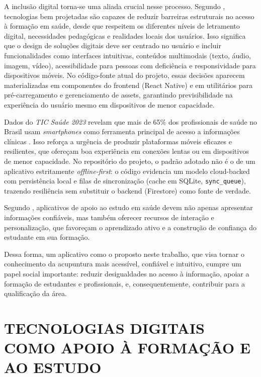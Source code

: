     A inclusão digital torna-se uma aliada crucial nesse processo. Segundo , tecnologias bem projetadas são capazes de reduzir barreiras estruturais no acesso à formação em saúde, desde que respeitem os diferentes níveis de letramento digital, necessidades pedagógicas e realidades locais dos usuários. Isso significa que o design de soluções digitais deve ser centrado no usuário e incluir funcionalidades como interfaces intuitivas, conteúdos multimodais (texto, áudio, imagem, vídeo), acessibilidade para pessoas com deficiência e responsividade para dispositivos móveis. No código-fonte atual do projeto, essas decisões aparecem materializadas em componentes do frontend (React Native) e em utilitários para pré-carregamento e gerenciamento de assets, garantindo previsibilidade na experiência do usuário mesmo em dispositivos de menor capacidade.

    Dados do \textit{TIC Saúde 2023} revelam que mais de 65\% dos profissionais de saúde no Brasil usam \textit{smartphones} como ferramenta principal de acesso a informações clínicas \cite{ticsaude2023}. Isso reforça a urgência de produzir plataformas móveis eficazes e resilientes, que ofereçam boa experiência em conexões lentas ou em dispositivos de menor capacidade. No repositório do projeto, o padrão adotado não é o de um aplicativo estritamente \textit{offline-first}: o código evidencia um modelo cloud-backed com persistência local e filas de sincronização (cache em SQLite, \texttt{sync\_queue}), trazendo resiliência sem substituir o backend (Firestore) como fonte de verdade.

Segundo , aplicativos de apoio ao estudo em saúde devem não apenas apresentar informações confiáveis, mas também oferecer recursos de interação e personalização, que favoreçam o aprendizado ativo e a construção de confiança do estudante em sua formação.

Dessa forma, um aplicativo como o proposto neste trabalho, que visa tornar o conhecimento da acupuntura mais acessível, confiável e intuitivo, cumpre um papel social importante: reduzir desigualdades no acesso à informação, apoiar a formação de estudantes e profissionais, e, consequentemente, contribuir para a qualificação da área.

\section{TECNOLOGIAS DIGITAIS COMO APOIO À FORMAÇÃO E AO ESTUDO} \label{sec:tecnologias_digitais}

